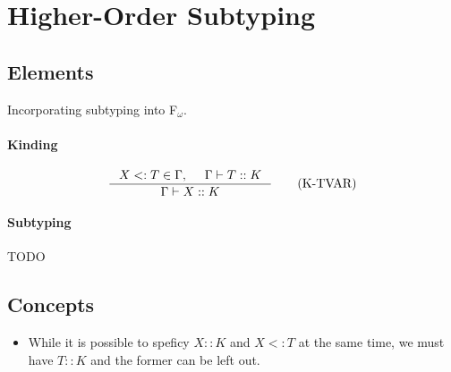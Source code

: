 \documentclass{article}
\begin{document}
\section{Higher-Order Subtyping}
\subsection{Elements}
  Incorporating subtyping into F$_{\omega}$.

\paragraph{Kinding}
  \begin{align*}
    \inference
      {X <: T \in \Gamma,
      &\Gamma\vdash T :: K}
      {\Gamma\vdash X :: K}
      \tag{K-TVAR}
  \end{align*}

\paragraph{Subtyping}
  TODO

\subsection{Concepts}
  \begin{itemize}
    \item While it is possible to speficy $X::K$ and $X<:T$ at the same time,
      we must have $T :: K$ and the former can be left out.
  \end{itemize}
\end{document}
